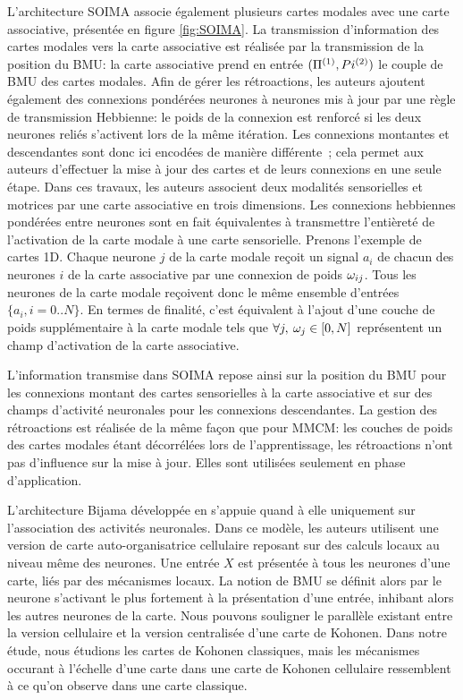 \documentclass[../main]{subfiles}
\begin{document}
{L'architecture SOIMA \cite{escobar-juarez_self-organized_2016} associe également plusieurs cartes modales avec une carte associative, présentée en figure \ref{fig:SOIMA}.
La transmission d'information des cartes modales vers la carte associative est réalisée par la transmission de la position du BMU: la carte associative prend en entrée $(\Pi^{({1})},Pi^{({2})})$ le couple de BMU des cartes modales. 
Afin de gérer les rétroactions, les auteurs ajoutent également des connexions pondérées neurones à neurones mis à jour par une règle de transmission Hebbienne: le poids de la connexion est renforcé si les deux neurones reliés s'activent lors de la même itération.
Les connexions montantes et descendantes sont donc ici encodées de manière différente~; cela permet aux auteurs d'effectuer la mise à jour des cartes et de leurs connexions en une seule étape. Dans ces travaux, les auteurs associent deux modalités sensorielles et motrices par une carte associative en trois dimensions.
Les connexions hebbiennes pondérées entre neurones sont en fait équivalentes à transmettre l'entièreté de l'activation de la carte modale à une carte sensorielle.
Prenons l'exemple de cartes 1D.
Chaque neurone $j$ de la carte modale reçoit un signal $a_{i}$ de chacun des neurones $i$ de la carte associative par une connexion de poids $\omega_{ij}$. Tous les neurones de la carte modale reçoivent donc le même ensemble d'entrées $ \{a_{i}, i = 0 .. N\}$.
En termes de finalité, c'est équivalent à l'ajout d'une couche de poids supplémentaire à la carte modale tels que $\forall j, \: \omega_j \in [0,N]$ représentent un champ d'activation de la carte associative.


L'information transmise dans SOIMA repose ainsi sur la position du BMU pour les connexions montant des cartes sensorielles à la carte associative et sur des champs d'activité neuronales pour les connexions descendantes.
La gestion des rétroactions est réalisée de la même façon que pour MMCM: les couches de poids des cartes modales étant décorrélées lors de l'apprentissage, les rétroactions n'ont pas d'influence sur la mise à jour. Elles sont utilisées seulement en phase d'application.

L'architecture Bijama développée en \cite{menard05,khouzam_2013} s'appuie quand à elle uniquement sur l'association des activités neuronales. Dans ce modèle, les auteurs utilisent une version de carte auto-organisatrice cellulaire reposant sur des calculs locaux au niveau même des neurones. 
Une entrée $X$ est présentée à tous les neurones d'une carte, liés par des mécanismes locaux. La notion de BMU se définit alors par le neurone s'activant le plus fortement à la présentation d'une entrée, inhibant alors les autres neurones de la carte.
Nous pouvons souligner le parallèle existant entre la version cellulaire et la version centralisée d'une carte de Kohonen. Dans notre étude, nous étudions les cartes de Kohonen classiques, mais les mécanismes occurant à l'échelle d'une carte dans une carte de Kohonen cellulaire ressemblent à ce qu'on observe dans une carte classique.

}
\end{document}
